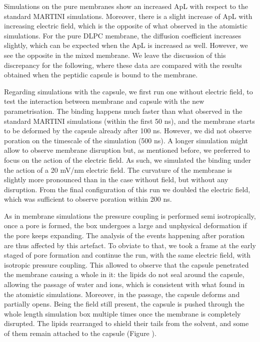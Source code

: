 Simulations on the pure membranes show an increased ApL with respect to the standard MARTINI simulations. Moreover, there is a slight increase of ApL with increasing electric field, which is the opposite of what observed in the atomistic simulations.
%
For the pure DLPC membrane, the diffusion coefficient increases slightly, which can be expected when the ApL is increased as well. However, we see the opposite in the mixed membrane. We leave the discussion of this discrepancy for the following, where these data are compared with the results obtained when the peptidic capsule is bound to the membrane.

Regarding simulations with the capsule, we first run one without electric field, to test the interaction between membrane and capsule with the new parametrisation. The binding happens much faster than what observed in the standard MARTINI simulations (within the first 50 ns), and the membrane starts to be deformed by the capsule already after 100 ns.
However, we did not observe poration on the timescale of the simulation (500 ns).
%
A longer simulation might allow to observe membrane disruption but, as mentioned before, we preferred to focus on the action of the electric field. As such, we simulated the binding under the action of a 20 mV/nm electric field. The curvature of the membrane is slightly more pronounced than in the case without field, but without any disruption.
From the final configuration of this run we doubled the electric field, which was sufficient to observe poration within 200 ns.

As in membrane simulations the pressure coupling is performed semi isotropically, once a pore is formed, the box undergoes a large and unphysical deformation if the pore keeps expanding. The analysis of the events happening after poration are thus affected by this artefact.
%
To obviate to that, we took a frame at the early staged of pore formation and continue the run, with the same electric field, with isotropic pressure coupling. This allowed to observe that the capsule penetrated the membrane causing a whole in it: the lipids do not seal around the capsule, allowing the passage of water and ions, which is consistent with what found in the atomistic simulations. Moreover, in the passage, the capsule deforms and partially opens.
%
Being the field still present, the capsule is pushed through the whole length simulation box multiple times once the membrane is completely disrupted. The lipids rearranged to shield their tails from the solvent, and some of them remain attached to the capsule (Figure \label{fig:martini_poration}).

